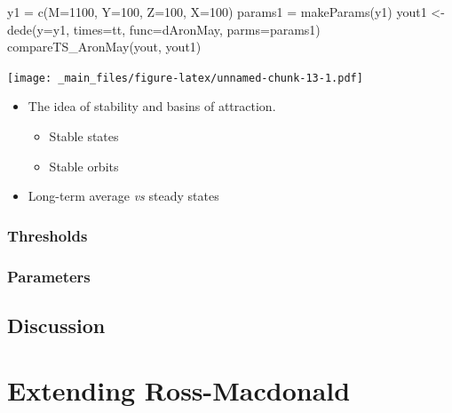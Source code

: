 \documentclass[
]{book}
\newenvironment{Shaded}{\begin{snugshade}}{\end{snugshade}}
\newcommand{\AttributeTok}[1]{\textcolor[rgb]{0.77,0.63,0.00}{#1}}
\newcommand{\DecValTok}[1]{\textcolor[rgb]{0.00,0.00,0.81}{#1}}
\newcommand{\FunctionTok}[1]{\textcolor[rgb]{0.00,0.00,0.00}{#1}}
\newcommand{\NormalTok}[1]{#1}
\newcommand{\OtherTok}[1]{\textcolor[rgb]{0.56,0.35,0.01}{#1}}
\begin{document}
\begin{Shaded}
\begin{Highlighting}[]
\NormalTok{y1 }\OtherTok{=} \FunctionTok{c}\NormalTok{(}\AttributeTok{M=}\DecValTok{1100}\NormalTok{, }\AttributeTok{Y=}\DecValTok{100}\NormalTok{, }\AttributeTok{Z=}\DecValTok{100}\NormalTok{, }\AttributeTok{X=}\DecValTok{100}\NormalTok{)}
\NormalTok{params1 }\OtherTok{=} \FunctionTok{makeParams}\NormalTok{(y1)}
\NormalTok{yout1 }\OtherTok{\textless{}{-}} \FunctionTok{dede}\NormalTok{(}\AttributeTok{y=}\NormalTok{y1, }\AttributeTok{times=}\NormalTok{tt, }\AttributeTok{func=}\NormalTok{dAronMay, }\AttributeTok{parms=}\NormalTok{params1) }
\FunctionTok{compareTS\_AronMay}\NormalTok{(yout, yout1)}
\end{Highlighting}
\end{Shaded}

\texttt{[image: \_main\_files/figure-latex/unnamed-chunk-13-1.pdf]}

\begin{itemize}
\item
  The idea of stability and basins of attraction.

  \begin{itemize}
  \item
    Stable states
  \item
    Stable orbits
  \end{itemize}
\item
  Long-term average \emph{vs} steady states
\end{itemize}

\hypertarget{thresholds}{%
\subsection{Thresholds}\label{thresholds}}

\hypertarget{parameters}{%
\subsection{Parameters}\label{parameters}}

\hypertarget{discussion}{%
\section{Discussion}\label{discussion}}

\hypertarget{extending-ross-macdonald}{%
\chapter{Extending Ross-Macdonald}\label{extending-ross-macdonald}}
\end{document}

